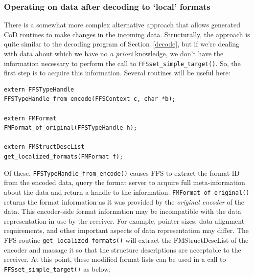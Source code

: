 \subsubsection{Operating on data after decoding to `local' formats}

There is a somewhat more complex alternative approach that allows generated
CoD routines to make changes in the incoming data.  Structurally, the
approach is quite similar to the decoding program of Section~\ref{decode},
but if we're dealing with data about which we have no {\it a priori}
knowledge, we don't have the information necessary to perform the call to
{\tt FFSset\_simple\_target()}.  So, the first step is to acquire this
information.  Several routines will be useful here:
\begin{verbatim}
extern FFSTypeHandle 
FFSTypeHandle_from_encode(FFSContext c, char *b);

extern FMFormat 
FMFormat_of_original(FFSTypeHandle h);

extern FMStructDescList
get_localized_formats(FMFormat f);
\end{verbatim}

Of these, {\tt FFSTypeHandle\_from\_encode()} causes FFS to extract the
format ID from the encoded data, query the format server to acquire full
meta-information about the data and return a handle to the information.
{\tt FMFormat\_of\_original()} returns the format information as it was
provided by the {\it original encoder} of the data.  This encoder-side
format information may be incompatible with the data representation in use
by the receiver.  For example, pointer sizes, data alignment requirements,
and other important aspects of data representation may differ.  The FFS
routine {\tt get\_localized\_formats()} will extract the FMStructDescList of
the encoder and massage it so that the structure descriptions are acceptable
to the receiver.  At this point, these modified format lists can be used in
a call to {\tt FFSset\_simple\_target()} as below;

